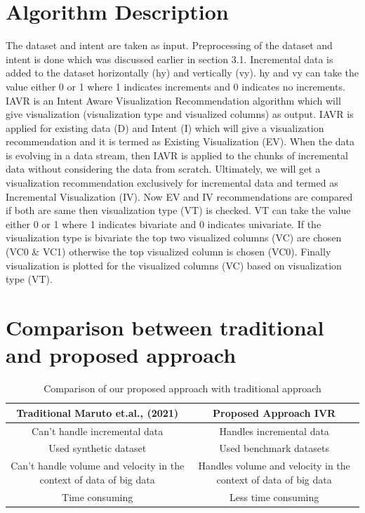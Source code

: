 \section{Algorithm Description}
The dataset and intent are taken as input. Preprocessing of the dataset and intent is done which was discussed earlier in section 3.1. Incremental data is added to the dataset horizontally (hy) and vertically (vy). hy and vy can take the value either 0 or 1 where 1 indicates increments and 0 indicates no increments. IAVR is an Intent Aware Visualization Recommendation algorithm \cite{maruta2021intent} which will give visualization (visualization type and visualized columns)  as output. IAVR is applied for existing data (D) and Intent (I) which will give a visualization recommendation and it is  termed as Existing Visualization (EV). When the data is evolving in a data stream, then IAVR \cite{maruta2021intent} is applied to the chunks of incremental data without considering the data from scratch. Ultimately, we will get a visualization recommendation exclusively for incremental data and termed as Incremental Visualization (IV). Now EV and IV recommendations are compared if both are same then visualization type (VT) is checked. VT can take the value either 0 or 1 where 1 indicates bivariate and 0 indicates univariate. If the visualization type is bivariate the top two visualized columns (VC) are chosen (VC0 \& VC1) otherwise the top visualized column is chosen (VC0). Finally visualization is plotted for the visualized columns (VC) based on visualization type (VT).




\section{Comparison between traditional and proposed approach}

\begin{table}[H]
\caption{Comparison of our proposed approach with traditional approach}\label{tab1}
\scalebox{0.56}
{
\begin{tabular}{|c|c|}
\hline
\textbf{Traditional Maruto et.al., (2021) \cite{maruta2021intent}} &  \textbf{Proposed Approach IVR}\\
\hline
Can’t handle incremental data & Handles incremental data\\
\hline
Used synthetic dataset &  Used benchmark datasets \\
\hline
Can’t handle volume and velocity in the context of data of big data & Handles volume and velocity in the context of data of big data\\
\hline
Time consuming & Less time consuming\\
\hline
\end{tabular}
}
\end{table}

